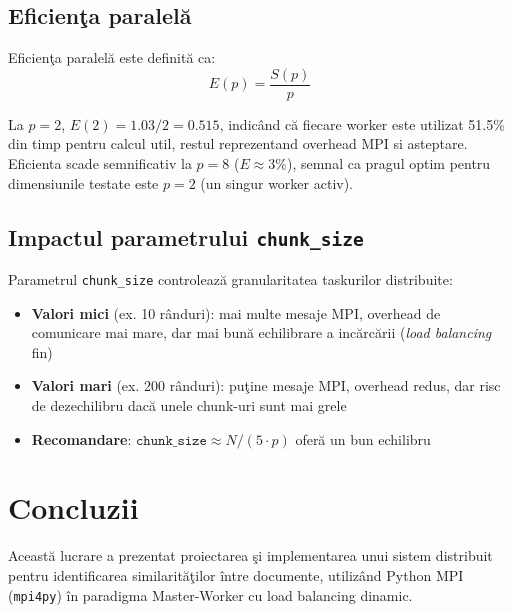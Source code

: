 \documentclass[a4paper,12pt]{report}
\begin{document}
\section{Eficien\c{t}a paralel\u{a}}

Eficien\c{t}a paralel\u{a} este definit\u{a} ca:
\begin{equation}
  E(p) = \frac{S(p)}{p}
\label{eq:efficiency}
\end{equation}

La $p=2$, $E(2) = 1.03/2 = 0.515$, indic\^{a}nd c\u{a} fiecare worker este utilizat 51.5\% din timp pentru calcul util, restul reprezentand overhead MPI si asteptare. Eficienta scade semnificativ la $p=8$ ($E \approx 3\%$), semnal ca pragul optim pentru dimensiunile testate este $p=2$ (un singur worker activ).

\section{Impactul parametrului \texttt{chunk\_size}}

Parametrul \texttt{chunk\_size} controleaz\u{a} granularitatea taskurilor distribuite:
\begin{itemize}
  \item \textbf{Valori mici} (ex. 10 r\^{a}nduri): mai multe mesaje MPI, overhead de comunicare mai mare, dar mai bun\u{a} echilibrare a inc\u{a}rc\u{a}rii (\textit{load balancing} fin)
  \item \textbf{Valori mari} (ex. 200 r\^{a}nduri): pu\c{t}ine mesaje MPI, overhead redus, dar risc de dezechilibru dac\u{a} unele chunk-uri sunt mai grele
  \item \textbf{Recomandare}: $\texttt{chunk\_size} \approx N / (5 \cdot p)$ ofer\u{a} un bun echilibru
\end{itemize}

\chapter{Concluzii}

Aceast\u{a} lucrare a prezentat proiectarea \c{s}i implementarea unui sistem distribuit pentru identificarea similarit\u{a}\c{t}ilor \^{i}ntre documente, utiliz\^{a}nd Python MPI (\texttt{mpi4py}) \^{i}n paradigma Master-Worker cu load balancing dinamic.
\end{document}
